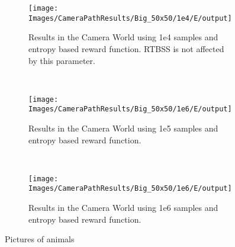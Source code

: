 \begin{figure}[h]
        \centering
        \begin{subfigure}[t]{0.3\textwidth}
                \texttt{[image: Images/CameraPathResults/Big\_50x50/1e4/E/output]}
                \caption{Results in the Camera World using 1e4 samples and entropy based reward
                function. RTBSS is not affected by this parameter.}
                \label{fig:m4e}
        \end{subfigure}%
        ~ %
        \begin{subfigure}[t]{0.3\textwidth}
                \texttt{[image: Images/CameraPathResults/Big\_50x50/1e6/E/output]}
                \caption{Results in the Camera World using 1e5 samples and entropy based reward
                function.}
                \label{fig:m5e}
        \end{subfigure}
        ~ %
        \begin{subfigure}[t]{0.3\textwidth}
                \texttt{[image: Images/CameraPathResults/Big\_50x50/1e6/E/output]}
                \caption{Results in the Camera World using 1e6 samples and entropy based reward
                function.}
                \label{fig:m6e}
        \end{subfigure}
        \caption{Pictures of animals}\label{fig:me}
\end{figure}

